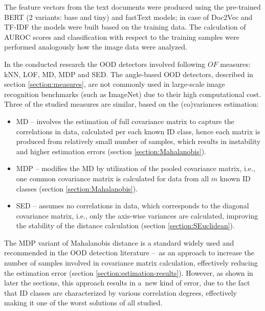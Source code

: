 The feature vectors from the text documents were produced using the pre-trained BERT (2 variants: base and tiny) and fastText models; in case of Doc2Vec and TF-IDF the models were built based on the training data. The calculation of AUROC scores and classification with respect to the training samples were performed analogously how the image data were analyzed.

In the conducted research the OOD detectors involved following $OF$ measures: kNN, LOF, MD, MDP and SED. The angle-based OOD detectors, described in section \ref{section:measures}, are not commonly used in large-scale image recognition benchmarks (such as ImageNet) due to their high computational cost. Three of the studied measures are similar, based on the (co)variances estimation:
\vspace{-0.5\baselineskip}
\begin{itemize}
    \item MD – involves the estimation of full covariance matrix to capture the correlations in data, calculated per each known ID class, hence each matrix is produced from relatively small number of samples, which results in instability and higher estimation errors (section \ref{section:Mahalanobis}).
    \item MDP – modifies the MD by utilization of the pooled covariance matrix, i.e., one common covariance matrix is calculated for data from all $m$ known ID classes (section \ref{section:Mahalanobis}).
    \item SED – assumes no correlations in data, which corresponds to the diagonal covariance matrix, i.e., only the axis-wise variances are calculated, improving the stability of the distance calculation (section \ref{section:SEuclidean}).
\end{itemize}

The MDP variant of Mahalanobis distance is a standard widely used and recommended in the OOD detection literature \cite{Lee-2018}\cite{Fort-2021}\cite{Tajwar-2021}\cite{Du-2022} –~as an approach to increase the number of samples involved in covariance matrix calculation, effectively reducing the estimation error (section \ref{section:estimation-results}). However, as shown in later the sections, this approach results in a~new kind of error, due to the fact that ID classes are characterized by various correlation degrees, effectively making it one of the worst solutions of all studied.

\cleardoublepage{}
